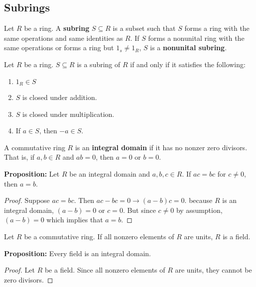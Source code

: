 \documentclass [12pt] {article}
\newenvironment{definition}[1]{\begin{tcolorbox}[title={Definition: #1},colback=blue!5!white,colframe=black!75!blue]}{\end{tcolorbox}}
\renewcommand{\bf}[1]{\textbf{{#1}}}
\begin{document}
\subsection{Subrings}
\begin{definition}{Subring}
    Let $R$ be a ring. A \bf{subring} $S \subseteq R$ is a subset such that $S$ forms a ring with
    the same operations and same identities as $R$. If $S$ forms a nonunital ring with the same
    operations or forms a ring but $1_s \neq 1_R$, $S$ is a \bf{nonunital subring}. \vspace{0.5em}

    Let $R$ be a ring. $S \subseteq R$ is a subring of $R$ if and only if it satisfies the following:
    \begin{enumerate}[label=(\arabic*)]
        \item $1_R \in S$
        \item $S$ is closed under addition.
        \item $S$ is closed under multiplication.
        \item If $a \in S$, then $-a \in S$.
    \end{enumerate}
\end{definition}

\begin{definition}{Integral Domain}
    A commutative ring $R$ is an \bf{integral domain} if it has no nonzer zero divisors. That is, 
    if $a, b \in R$ and $ab = 0$, then $a = 0$ or $b = 0$.
\end{definition}
\bf{Proposition:} Let $R$ be an integral domain and $a, b, c \in R$. If $ac = bc$ for $c \neq 0$,
then $a = b$.
\begin{proof}
    Suppose $ac = bc$. Then $ac - bc = 0 \to (a - b) c = 0$. because $R$ is an integral domain,
    $(a - b) = 0$ or $c = 0$. But since $c \neq 0$ by assumption, $(a - b) = 0$ which implies that
    $a = b$.
\end{proof}

\begin{definition}{Field}
    Let $R$ be a commutative ring. If all nonzero elements of $R$ are units, $R$ is a field.
\end{definition}
\newpage
\bf{Proposition:} Every field is an integral domain.
\begin{proof}
    Let $R$ be a field. Since all nonzero elements of $R$ are units, they cannot be zero divisors.
\end{proof}
\end{document}
